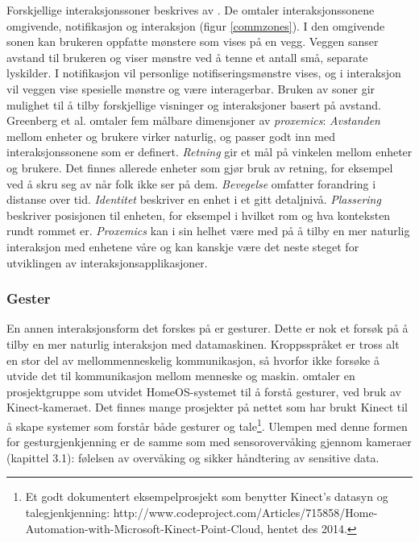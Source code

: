 Forskjellige interaksjonssoner beskrives av \citet{streitz05}. De omtaler interaksjonssonene omgivende, notifikasjon og interaksjon (figur \ref{commzones}). I den omgivende sonen kan brukeren oppfatte mønstere som vises på en vegg. Veggen sanser avstand til brukeren og viser mønstre ved å tenne et antall små, separate lyskilder. I notifikasjon vil personlige notifiseringsmønstre vises, og i interaksjon vil veggen vise spesielle mønstre og være interagerbar. Bruken av soner gir mulighet til å tilby forskjellige visninger og interaksjoner basert på avstand. Greenberg et al. omtaler fem målbare dimensjoner av \emph{proxemics}: \emph{Avstanden} mellom enheter og brukere virker naturlig, og passer godt inn med interaksjonssonene som er definert. \emph{Retning} gir et mål på vinkelen mellom enheter og brukere. Det finnes allerede enheter som gjør bruk av retning, for eksempel ved å skru seg av når folk ikke ser på dem. \emph{Bevegelse} omfatter forandring i distanse over tid. \emph{Identitet} beskriver en enhet i et gitt detaljnivå. \emph{Plassering} beskriver posisjonen til enheten, for eksempel i hvilket rom og hva konteksten rundt rommet er. \emph{Proxemics} kan i sin helhet være med på å tilby en mer naturlig interaksjon med enhetene våre og kan kanskje være det neste steget for utviklingen av interaksjonsapplikasjoner.

\subsubsection*{Gester}
En annen interaksjonsform det forskes på er gesturer. Dette er nok et forsøk på å tilby en mer naturlig interaksjon med datamaskinen. Kroppsspråket er tross alt en stor del av mellommenneskelig kommunikasjon, så hvorfor ikke forsøke å utvide det til kommunikasjon mellom menneske og maskin. \citet{homeos} omtaler en prosjektgruppe som utvidet HomeOS-systemet til å forstå gesturer, ved bruk av Kinect-kameraet. Det finnes mange prosjekter på nettet som har brukt Kinect til å skape systemer som forstår både gesturer og tale\footnote{Et godt dokumentert eksempelprosjekt som benytter Kinect's datasyn og talegjenkjenning: http://www.codeproject.com/Articles/715858/Home-Automation-with-Microsoft-Kinect-Point-Cloud, hentet des 2014.}. Ulempen med denne formen for gesturgjenkjenning er de samme som med sensorovervåking gjennom kameraer (kapittel 3.1): følelsen av overvåking og sikker håndtering av sensitive data. 

